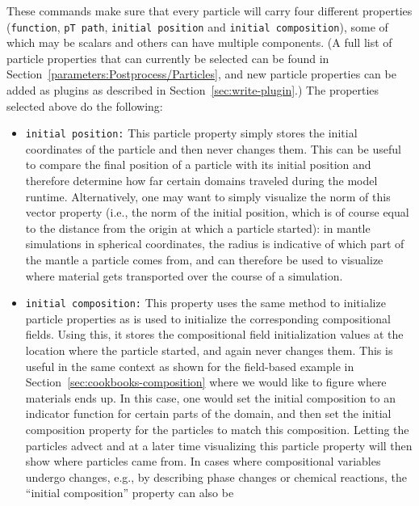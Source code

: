 \documentclass{article}
\begin{document}


These commands make sure that every particle will carry four different
properties (\texttt{function}, \texttt{pT path}, \texttt{initial
  position} and \texttt{initial composition}), some of which may be
scalars and others can have multiple components. (A full list of
particle properties that can currently be selected can be found in
Section~\ref{parameters:Postprocess/Particles}, and new particle
properties can be added as plugins as described in
Section~\ref{sec:write-plugin}.) The properties selected above do the following:

\begin{itemize}
\item \texttt{initial position:} This particle property simply stores
  the initial coordinates of the particle and then never changes them. This
  can be useful to compare the final position of a particle with its 
  initial position and therefore determine how far certain domains traveled 
  during the model runtime. Alternatively, one may want to simply visualize
  the norm of this vector property (i.e., the norm of the initial position,
  which is of course equal to the distance from the origin at which a particle
  started): in mantle simulations in spherical coordinates, the radius is
  indicative of which part of the mantle a particle comes from, and can
  therefore be used to visualize where material gets transported over the course
  of a simulation.
\item \texttt{initial composition:} This property uses the same
  method to initialize particle properties as is used to initialize
  the corresponding compositional fields. Using this, it stores the
  compositional field initialization values at the location where the particle
  started, and again never changes them. This is useful in the same
  context as shown for the field-based example in
  Section~\ref{sec:cookbooks-composition} where we would like to
  figure where materials ends up. In this case, one would set the
  initial composition to an indicator function for certain parts of
  the domain, and then set the initial composition property for the
  particles to match this composition. Letting the particles advect
  and at a later time visualizing this particle property will then
  show where particles came from. In cases where compositional
  variables undergo changes, e.g., by describing phase changes or
  chemical reactions, the ``initial composition'' property can also be

\end{itemize}
\end{document}
